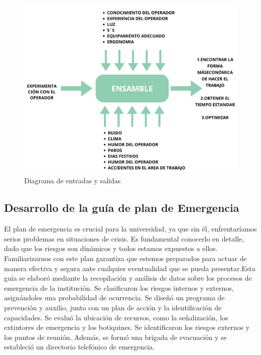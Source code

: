     \begin{figure}[H]
        \centering
        \includegraphics[trim = {1mm 1mm 1mm 1mm},clip,scale=0.2]{34/img/diagramaEntradaSalida.png}
        \caption{Diagrama de entradas y salidas}
        \label{fig:enter-label6}
    \end{figure}
    
    
    
    \subsection{Desarrollo de la guía de plan de Emergencia}
    El plan de emergencia es crucial para la universidad, ya que sin él, enfrentaríamos serios problemas en situaciones de crisis. Es fundamental conocerlo en detalle, dado que los riesgos son dinámicos y todos estamos expuestos a ellos. Familiarizarnos con este plan garantiza que estemos preparados para actuar de manera efectiva y segura ante cualquier eventualidad que se pueda presentar.Esta guía se elaboró mediante la recopilación y análisis de datos sobre los procesos de emergencia de la institución. Se clasificaron los riesgos internos y externos, asignándoles una probabilidad de ocurrencia. Se diseñó un programa de prevención y auxilio, junto con un plan de acción y la identificación de capacidades. Se evaluó la ubicación de recursos, como la señalización, los extintores de emergencia y los botiquines. Se identificaron los riesgos externos y los puntos de reunión. Además, se formó una brigada de evacuación y se estableció un directorio telefónico de emergencia.
